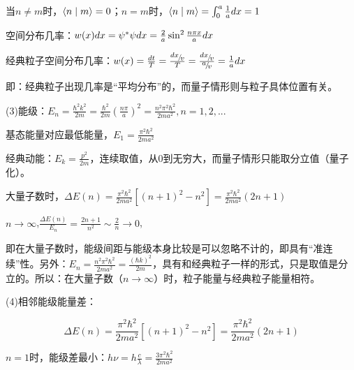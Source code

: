 当$n \ne m$时，$\left\langle {n}
 \mathrel{\left | {\vphantom {n m}}
 \right. \kern-\nulldelimiterspace}
 {m} \right\rangle  = 0$；$n=m$时，$\left\langle {n}
 \mathrel{\left | {\vphantom {n m}}
 \right. \kern-\nulldelimiterspace}
 {m} \right\rangle  = \int_0^a {{\textstyle{1 \over a}}} dx = 1$


空间分布几率：$w(x) dx = \psi ^* \psi dx = {\textstyle{2 \over a}}\sin ^2 {\textstyle{{n\pi x} \over a}}dx$

经典粒子空间分布几率：$w(x) = \frac{{dt}}{T} = \frac{{{\raise0.5ex\hbox{$\scriptstyle {dx}$}
\kern-0.1em/\kern-0.15em
\lower0.25ex\hbox{$\scriptstyle v$}}}}{T} = \frac{{{\raise0.5ex\hbox{$\scriptstyle {dx}$}
\kern-0.1em/\kern-0.15em
\lower0.25ex\hbox{$\scriptstyle v$}}}}{{{\raise0.5ex\hbox{$\scriptstyle a$}
\kern-0.1em/\kern-0.15em
\lower0.25ex\hbox{$\scriptstyle v$}}}} = \frac{1}{a}dx$

即：经典粒子出现几率是``平均分布''的，而量子情形则与粒子具体位置有关。


(3)能级：$E_n  = \frac{{\hbar ^2 k^2 }}{{2m}} = \frac{{\hbar ^2 }}{{2m}}\left( {\frac{{n\pi }}{a}} \right)^2  = \frac{{n^2 \pi ^2 \hbar ^2 }}{{2ma^2 }},n = 1,2,...$


基态能量对应最低能量，$E_1  = \frac{{\pi ^2 \hbar ^2 }}{{2ma^2 }}$


经典动能：$E_k  = \frac{{p^2 }}{{2m}}$，连续取值，从0到无穷大，而量子情形只能取分立值（量子化）。



大量子数时，$\Delta E(n) = \frac{{\pi ^2 \hbar ^2 }}{{2ma^2 }}\left[ {\left( {n + 1} \right)^2  - n^2 } \right] = \frac{{\pi ^2 \hbar ^2 }}{{2ma^2 }}\left( {2n + 1} \right)$


$n \to \infty $,$\frac{{\Delta E(n)}}{{E_n }} = \frac{{2n + 1}}{{n^2 }} \sim \frac{2}{n} \to 0$,

即在大量子数时，能级间距与能级本身比较是可以忽略不计的，即具有``准连续''性。另外：$E_n  = \frac{{n^2 \pi ^2 \hbar ^2 }}{{2ma^2 }} = \frac{{\left( {\hbar k} \right)^2 }}{{2m}}$，具有和经典粒子一样的形式，只是取值是分立的。所以：在大量子数（$n \to \infty $）时，粒子能量与经典粒子能量相符。


(4)相邻能级能量差：

\begin{equation}
\Delta E(n) = \frac{{\pi ^2 \hbar ^2 }}{{2ma^2 }}\left[ {\left( {n + 1} \right)^2  - n^2 } \right] = \frac{{\pi ^2 \hbar ^2 }}{{2ma^2 }}\left( {2n + 1} \right)
\end{equation}

$n=1$时，能级差最小：$h\nu  = h\frac{c}{\lambda } = \frac{{3\pi ^2 \hbar ^2 }}{{2ma^2 }}$

